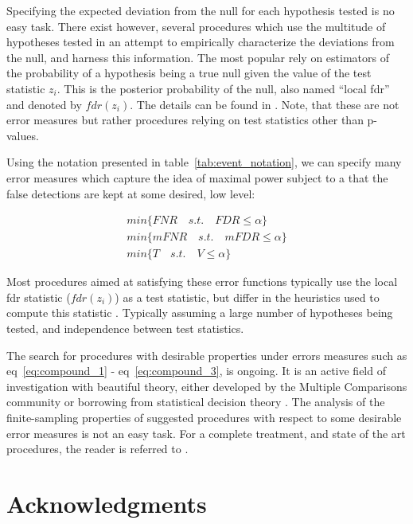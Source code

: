 \documentclass[review,12pt]{article}
\begin{document}
Specifying the expected deviation from the null for each hypothesis tested is no easy task. There exist however, several procedures which use the multitude of hypotheses tested in an attempt to empirically characterize the deviations from the null, and harness this information. The most popular rely on estimators of the probability of a hypothesis being a true null given the value of the test statistic $z_i$. This is the posterior probability of the null, also named ``local fdr'' and denoted by $fdr(z_i)$. The details can be found in \cite{efron_microarrays_2008}. Note, that these are not error measures but rather procedures relying on test statistics other than p-values.  

Using the notation presented in table~\ref{tab:event_notation}, we can specify many error measures which capture the idea of maximal power subject to a  that the false detections are kept at some desired, low level:

\begin{align}
        min\{FNR \quad s.t. \quad FDR\leq \alpha \} \label{eq:compound_1}\\
	min\{mFNR \quad s.t. \quad mFDR\leq \alpha \} \label{eq:compound_2}\\
	min\{T \quad s.t. \quad V \leq \alpha \} \label{eq:compound_3}
\end{align}


Most procedures aimed at satisfying these error functions typically use the local fdr statistic ($fdr(z_i)$) as a test statistic, but differ in the heuristics used to  compute this statistic \cite[eg.][]{storey_direct_2002,efron_microarrays_2008,sun_oracle_2007}. Typically assuming a large number of hypotheses being tested, and independence between test statistics. 

The search for procedures with desirable properties under errors measures such as eq~\ref{eq:compound_1}  - eq~\ref{eq:compound_3}, is ongoing. It is an active field of investigation with beautiful theory, either developed by the Multiple Comparisons community or borrowing from statistical decision theory \cite[see][]{sun_oracle_2007}. The analysis of the finite-sampling properties of suggested procedures with respect to some desirable error measures is not an easy task.  For a complete treatment, and state of the art procedures, the reader is referred to \cite{efron2010large}.








\section{Acknowledgments}
\end{document}
